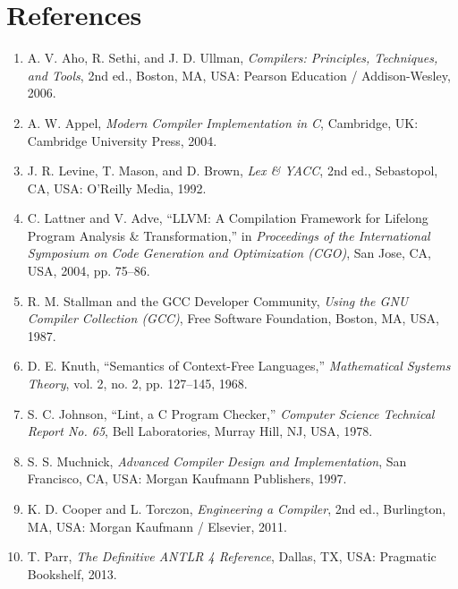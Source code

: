 \chapter*{References}
\begin{enumerate}
    \item A. V. Aho, R. Sethi, and J. D. Ullman, \textit{Compilers: Principles, Techniques, and Tools}, 2nd ed., Boston, MA, USA: Pearson Education / Addison-Wesley, 2006.
    
    \item A. W. Appel, \textit{Modern Compiler Implementation in C}, Cambridge, UK: Cambridge University Press, 2004.
    
    \item J. R. Levine, T. Mason, and D. Brown, \textit{Lex \& YACC}, 2nd ed., Sebastopol, CA, USA: O'Reilly Media, 1992.
    
    \item C. Lattner and V. Adve, ``LLVM: A Compilation Framework for Lifelong Program Analysis \& Transformation,'' in \textit{Proceedings of the International Symposium on Code Generation and Optimization (CGO)}, San Jose, CA, USA, 2004, pp. 75--86.
    
    \item R. M. Stallman and the GCC Developer Community, \textit{Using the GNU Compiler Collection (GCC)}, Free Software Foundation, Boston, MA, USA, 1987.
    
    \item D. E. Knuth, ``Semantics of Context-Free Languages,'' \textit{Mathematical Systems Theory}, vol. 2, no. 2, pp. 127--145, 1968.
    
    \item S. C. Johnson, ``Lint, a C Program Checker,'' \textit{Computer Science Technical Report No. 65}, Bell Laboratories, Murray Hill, NJ, USA, 1978.
    
    \item S. S. Muchnick, \textit{Advanced Compiler Design and Implementation}, San Francisco, CA, USA: Morgan Kaufmann Publishers, 1997.
    
    \item K. D. Cooper and L. Torczon, \textit{Engineering a Compiler}, 2nd ed., Burlington, MA, USA: Morgan Kaufmann / Elsevier, 2011.
    
    \item T. Parr, \textit{The Definitive ANTLR 4 Reference}, Dallas, TX, USA: Pragmatic Bookshelf, 2013.
    

\end{enumerate}
